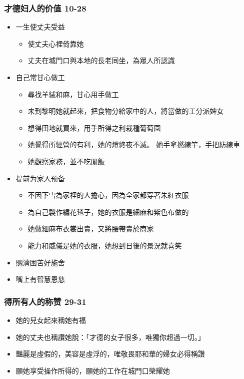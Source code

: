 \subsubsection{才德妇人的价值 10-28}
\begin{itemize}
\itemsep-.45em 
\item 一生使丈夫受益
\begin{itemize}
\itemsep-.45em 
\item 使丈夫心裡倚靠她
\item 丈夫在城門口與本地的長老同坐，為眾人所認識
\end{itemize}
\item 自己常甘心做工
\begin{itemize}
\itemsep-.45em 
\item 尋找羊絨和麻，甘心用手做工
\item 未到黎明她就起來，把食物分給家中的人，將當做的工分派婢女
\item 想得田地就買來，用手所得之利栽種葡萄園
\item 她覺得所經營的有利，她的燈終夜不滅。 她手拿撚線竿，手把紡線車
\item 她觀察家務，並不吃閒飯
\end{itemize}
\item 提前为家人预备
\begin{itemize}
\itemsep-.45em 
\item 不因下雪為家裡的人擔心，因為全家都穿著朱紅衣服
\item 為自己製作繡花毯子，她的衣服是細麻和紫色布做的
\item 她做細麻布衣裳出賣，又將腰帶賣於商家
\item 能力和威儀是她的衣服，她想到日後的景況就喜笑
\end{itemize}
\item 賙濟困苦好施舍
\item 嘴上有智慧恩慈
\end{itemize}
\subsubsection{得所有人的称赞 29-31}
\begin{itemize}
\itemsep-.45em 
\item 她的兒女起來稱她有福
\item 她的丈夫也稱讚她說：「才德的女子很多，唯獨你超過一切。」
\item 豔麗是虛假的，美容是虛浮的，唯敬畏耶和華的婦女必得稱讚
\item 願她享受操作所得的，願她的工作在城門口榮耀她
\end{itemize}


